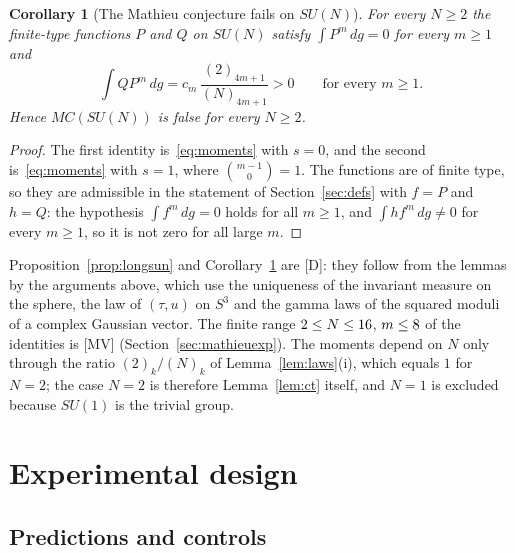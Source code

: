 \documentclass[11pt]{article}
\newtheorem{mathcor}[proposition]{Corollary}
\theoremstyle{remark}
\begin{document}
\begin{mathcor}[The Mathieu conjecture fails on $SU(N)$]\label{cor:mathieusun}
For every $N\ge2$ the finite-type functions $P$ and $Q$ on $SU(N)$ satisfy $\int P^m\,dg=0$ for every $m\ge1$ and
\[
\int QP^m\,dg=c_m\,\frac{(2)_{4m+1}}{(N)_{4m+1}}>0\qquad\text{for every }m\ge1.
\]
Hence $MC(SU(N))$ is false for every $N\ge2$.
\end{mathcor}
\begin{proof}
The first identity is~\eqref{eq:moments} with $s=0$, and the second is~\eqref{eq:moments} with $s=1$, where $\binom{m-1}{0}=1$. The functions are of finite type, so they are admissible in the statement of Section~\ref{sec:defs} with $f=P$ and $h=Q$: the hypothesis $\int f^m\,dg=0$ holds for all $m\ge1$, and $\int hf^m\,dg\ne0$ for every $m\ge1$, so it is not zero for all large $m$. \qedhere
\end{proof}

Proposition~\ref{prop:longsun} and Corollary~\ref{cor:mathieusun} are [D]: they follow from the lemmas by the arguments above, which use the uniqueness of the invariant measure on the sphere, the law of $(\tau,u)$ on $S^3$ and the gamma laws of the squared moduli of a complex Gaussian vector. The finite range $2\le N\le16$, $m\le8$ of the identities is [MV] (Section~\ref{sec:mathieuexp}). The moments depend on $N$ only through the ratio $(2)_k/(N)_k$ of Lemma~\ref{lem:laws}(i), which equals $1$ for $N=2$; the case $N=2$ is therefore Lemma~\ref{lem:ct} itself, and $N=1$ is excluded because $SU(1)$ is the trivial group.

\section{Experimental design}\label{sec:design}

\subsection{Predictions and controls}\label{sec:predictions}
\end{document}
